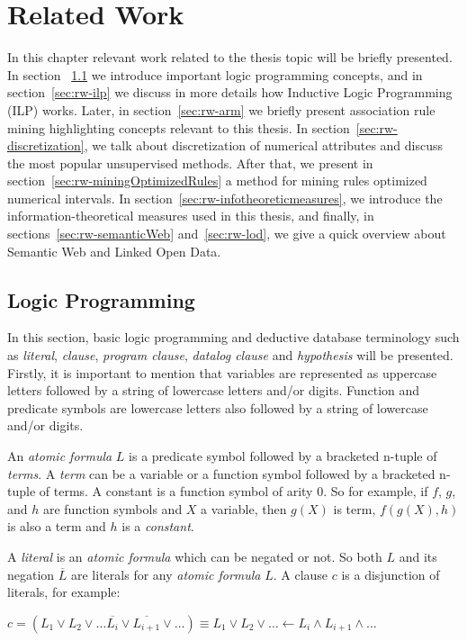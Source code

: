 \chapter{Related Work}
\label{sec:rw-intro}

In this chapter relevant work related to the thesis topic will be briefly presented. In section 
~\ref{sec:rw-lp} we introduce important logic programming concepts, and in section~\ref{sec:rw-ilp} we discuss in
more details how Inductive Logic Programming (ILP) works. Later, in section~\ref{sec:rw-arm} we briefly present
association rule mining highlighting concepts relevant to this thesis. In section~\ref{sec:rw-discretization}, we
talk about discretization of numerical attributes and discuss the most popular unsupervised methods. After that, we
present in section~\ref{sec:rw-miningOptimizedRules} a method for mining rules optimized numerical intervals. In
section~\ref{sec:rw-infotheoreticmeasures}, we introduce the information-theoretical measures used in this thesis,
and finally, in sections~\ref{sec:rw-semanticWeb} and~\ref{sec:rw-lod}, we give a quick overview about Semantic Web
and Linked Open Data.


\section{Logic Programming}
\label{sec:rw-lp}

\cite{DBLP:books/sp/Lloyd87}
\cite{DBLP:journals/ml/LavracD96}
In this section, basic logic programming and deductive database terminology such as \emph{literal}, \emph{clause},
\emph{program clause}, \emph{datalog clause} and \emph{hypothesis} will be presented. Firstly, it is important to
mention that variables are represented as uppercase letters followed by a string of lowercase letters and/or digits.
Function and predicate symbols are lowercase letters also followed by a string of lowercase and/or digits.

An \emph{atomic formula} $L$ is a predicate symbol followed by a bracketed n-tuple of \emph{terms}. A \emph{term} can
be
a variable or a function symbol followed by a bracketed n-tuple of terms. A constant is a function symbol of arity 0.
So
for example, if $f$, $g$, and $h$ are function symbols and $X$ a variable, then $g(X)$ is term, $f(g(X),h)$ is also a
term and $h$ is a \emph{constant}.

A \emph{literal} is an \emph{atomic formula} which can be negated or not. So both $L$ and its negation $\overline{L}$
are literals for any \emph{atomic formula} $L$. A clause $c$ is a disjunction of literals, for example:
\begin{center}
  $c=(L_1 \vee L_2 \vee \ldots \overline{L_{i}} \vee \overline{L_{i+1}} \vee \ldots) \equiv
 L_1 \vee L_2 \vee \ldots \leftarrow L_i \wedge L_{i+1} \wedge \ldots$
\end{center}

